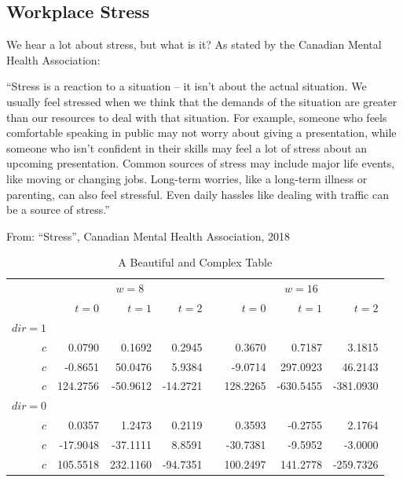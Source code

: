 \subsection{Workplace Stress}


We hear a lot about stress, but what is it? As stated by the Canadian Mental Health Association: 


    “Stress is a reaction to a situation – it isn't about the actual situation. We usually feel stressed when we think that the demands of the situation are greater than our resources to deal with that situation. For example, someone who feels comfortable speaking in public may not worry about giving a presentation, while someone who isn't confident in their skills may feel a lot of stress about an upcoming presentation. Common sources of stress may include major life events, like moving or changing jobs. Long-term worries, like a long-term illness or parenting, can also feel stressful. Even daily hassles like dealing with traffic can be a source of stress.”

    From: “Stress”, Canadian Mental Health Association, 2018


\begin{table}\centering
{}
\begin{tabular}{@{}rrrrcrrr@{}}\toprule
& \multicolumn{3}{c}{$w = 8$} & \phantom{abc}& \multicolumn{3}{c}{$w = 16$} \\
\cmidrule{2-4} \cmidrule{6-8} 
& $t=0$ & $t=1$ & $t=2$ && $t=0$ & $t=1$ & $t=2$\\ \midrule
$dir=1$\\
$c$ & 0.0790 & 0.1692 & 0.2945 && 0.3670 & 0.7187 & 3.1815\\
$c$ & -0.8651& 50.0476& 5.9384&& -9.0714& 297.0923& 46.2143\\
$c$ & 124.2756& -50.9612& -14.2721&& 128.2265& -630.5455& -381.0930\\
$dir=0$\\
$c$ & 0.0357& 1.2473& 0.2119&& 0.3593& -0.2755& 2.1764\\
$c$ & -17.9048& -37.1111& 8.8591&& -30.7381& -9.5952& -3.0000\\
$c$ & 105.5518& 232.1160& -94.7351&& 100.2497& 141.2778& -259.7326\\
\bottomrule
\end{tabular}
\caption{A Beautiful and Complex Table}\label{tab:sometable}
\end{table}



